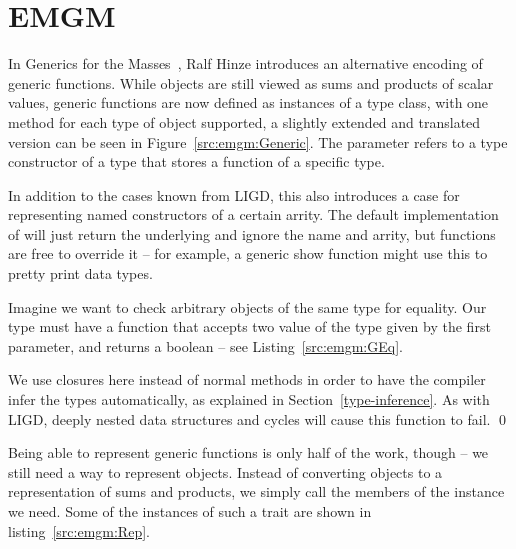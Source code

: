 \section{EMGM}


In Generics for the Masses~\cite{GM}, Ralf Hinze introduces an alternative
encoding of generic functions. While objects are still viewed as sums and
products of scalar values, generic functions are now defined as instances
of a  type class, with one method for each type of object
supported, a slightly extended and translated version can be seen in Figure~\ref{src:emgm:Generic}.
The parameter  refers to a type constructor of a type that stores
a function of a specific type.



In addition to the cases known from LIGD, this also introduces a 
case for representing named constructors of a certain arrity. The default
implementation of  will just return the underlying  and
ignore the name and arrity, but functions are free to override it -- for example,
a generic show function might use this to pretty print data types.

\begin{example}
Imagine we want to check arbitrary objects of the same type for equality.
Our type  must have a function that accepts two
value of the type given by the first parameter, and returns a boolean
-- see Listing~\ref{src:emgm:GEq}.


We use closures here instead of normal methods in order to have the
compiler infer the types automatically, as explained in Section~\ref{type-inference}.
As with LIGD, deeply nested data structures and cycles will cause this
function to fail. \qed{}
\end{example}

Being able to represent generic functions is only half of the work, though
-- we still need a way to represent objects. Instead of converting objects
to a representation of sums and products, we simply call the members of
the  instance we need. Some of the instances of such a 
trait are shown in listing~\ref{src:emgm:Rep}.



